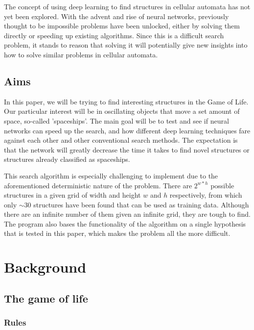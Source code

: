 \documentclass{l4proj}
\begin{document}
The concept of using deep learning to find structures in cellular automata has not yet been explored. With the advent and rise of neural networks, previously thought to be impossible problems have been unlocked, either by solving them directly or speeding up existing algorithms. Since this is a difficult search problem, it stands to reason that solving it will potentially give new insights into how to solve similar problems in cellular automata.


\section{Aims}

In this paper, we will be trying to find interesting structures in the Game of Life. Our particular interest will be in oscillating objects that move a set amount of space, so-called 'spaceships'. The main goal will be to test and see if neural networks can speed up the search, and how different deep learning techniques fare against each other and other conventional search methods. The expectation is that the network will greatly decrease the time it takes to find novel structures or structures already classified as spaceships.

This search algorithm is especially challenging to implement due to the aforementioned deterministic nature of the problem. There are $2^{w * h}$ possible structures in a given grid of width and height $w$ and $h$ respectively, from which only $\sim{30}$ structures have been found that can be used as training data. Although there are an infinite number of them given an infinite grid, they are tough to find. The program also bases the functionality of the algorithm on a single hypothesis that is tested in this paper, which makes the problem all the more difficult. 


\chapter{Background}

\section{The game of life}

\subsection{Rules}
\end{document}
